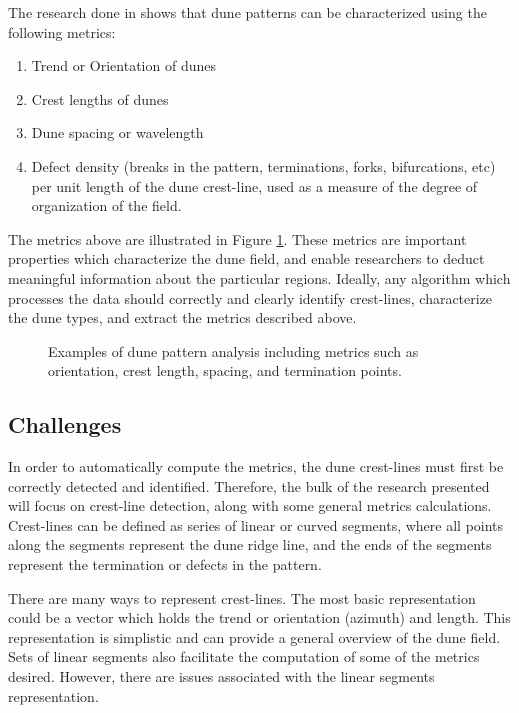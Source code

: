 The research done in \cite{ewing-kocurek-lake-2006,ewing-peyret-kocurek-bourke-2010} shows that dune patterns can be characterized using the following metrics:
\begin{enumerate}
	\item Trend or Orientation of dunes
	\item Crest lengths of dunes
	\item Dune spacing or wavelength
	\item Defect density (breaks in the pattern, terminations, forks, bifurcations, etc) per unit length of the dune crest-line, used as a measure of the degree of organization of the field.
\end{enumerate}

The metrics above are illustrated in Figure \ref{fig:dune_pattern_metrics}. These metrics are important properties which characterize the dune field, and enable researchers to deduct meaningful information about the particular regions. Ideally, any algorithm which processes the data should correctly and clearly identify crest-lines, characterize the dune types, and extract the metrics described above.

\begin{figure}
	\centering
	\caption{Examples of dune pattern analysis including metrics such as orientation, crest length, spacing, and termination points.}
	\label{fig:dune_pattern_metrics}
\end{figure}

\subsection{Challenges}

In order to automatically compute the metrics, the dune crest-lines must first be correctly detected and identified. Therefore, the bulk of the research presented will focus on crest-line detection, along with some general metrics calculations. Crest-lines can be defined as series of linear or curved segments, where all points along the segments represent the dune ridge line, and the ends of the segments represent the termination or defects in the pattern.

There are many ways to represent crest-lines. The most basic representation could be a vector which holds the trend or orientation (azimuth) and length. This representation is simplistic and can provide a general overview of the dune field. Sets of linear segments also facilitate the computation of some of the metrics desired. However, there are issues associated with the linear segments representation.

